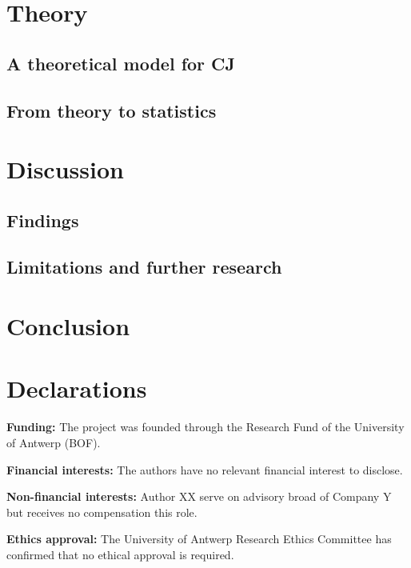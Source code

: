 \documentclass[
  authoryear,
  preprint,
  1p]{elsarticle}
\begin{document}
\section{Theory}\label{sec-theory}

\subsection{A theoretical model for CJ}\label{sec-theory-theoretical}

\subsection{From theory to statistics}\label{sec-theory-statistics}

\section{Discussion}\label{sec-discuss}

\subsection{Findings}\label{sec-discuss-finding}

\subsection{Limitations and further
research}\label{sec-discuss-limitations}

\section{Conclusion}\label{sec-conclusion}

\newpage{}

\section*{Declarations}\label{declarations}

\textbf{Funding:} The project was founded through the Research Fund of
the University of Antwerp (BOF).

\textbf{Financial interests:} The authors have no relevant financial
interest to disclose.

\textbf{Non-financial interests:} Author XX serve on advisory broad of
Company Y but receives no compensation this role.

\textbf{Ethics approval:} The University of Antwerp Research Ethics
Committee has confirmed that no ethical approval is required.
\end{document}
